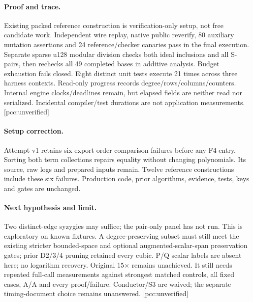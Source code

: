 \documentclass[10pt,a4paper]{article}
\begin{document}
\paragraph{Proof and trace.} Existing packed reference construction is
verification-only setup, not free candidate work. Independent wire replay,
native public reverify, 80 auxiliary mutation assertions and 24 reference/checker
canaries pass in the final execution. Separate sparse u128 modular division
checks both ideal inclusions and all S-pairs, then rechecks all 49 completed
bases in additive analysis. Budget exhaustion fails closed. Eight distinct
unit tests execute 21 times across three harness contexts. Read-only progress
records degree/rows/columns/counters. Internal engine clocks/deadlines remain,
but elapsed fields are neither read nor serialized. Incidental compiler/test
durations are not application measurements. [pcc:unverified]
\paragraph{Setup correction.} Attempt-v1 retains six export-order comparison
failures before any F4 entry. Sorting both term collections repairs equality
without changing polynomials. Its source, raw logs and prepared inputs remain.
Twelve reference constructions include these six failures. Production code,
prior algorithms, evidence, tests, keys and gates are unchanged.
\paragraph{Next hypothesis and limit.} Two distinct-edge syzygies may suffice;
the pair-only panel has not run. This is exploratory on known fixtures. A
degree-preserving subset must still meet the existing stricter bounded-space
and optional augmented-scalar-span preservation gates; prior D2/3/4 pruning
retained every cubic. P/Q scalar labels are absent here; no logarithm recovery.
Original 15$\times$ remains unachieved. It still needs repeated full-call
measurements against strongest matched controls, all fixed cases, A/A and every
proof/failure. Conductor/S3 are waived; the separate timing-document choice
remains unanswered. [pcc:unverified]
\end{document}
